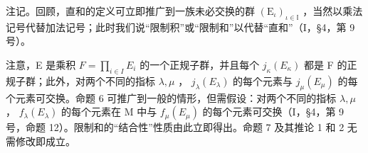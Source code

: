 注记。回顾，直和的定义可立即推广到一族未必交换的群 \((\mathrm{E}_{\iota})_{\iota\in\mathbb{I}}\) ，当然以乘法记号代替加法记号；此时我们说“限制积”或“限制和”以代替“直和”（I，§4，第 9 号）。

注意，E 是乘积 \(F = \prod_{i \in I} E_{i}\) 的一个正规子群，并且每个 \(j_{\kappa}(E_{\kappa})\) 都是 F 的正规子群；此外，对两个不同的指标 \(\lambda, \mu\) ， \(j_{\lambda}(E_{\lambda})\) 的每个元素与 \(j_{\mu}(E_{\mu})\) 的每个元素可交换。命题 6 可推广到一般的情形，但需假设：对两个不同的指标 \(\lambda, \mu\) ， \(f_{\lambda}(E_{\lambda})\) 的每个元素在 M 中与 \(f_{\mu}(E_{\mu})\) 的每个元素可交换（I，§4，第 9 号，命题 12）。限制和的“结合性”性质由此立即得出。命题 7 及其推论 1 和 2 无需修改即成立。

